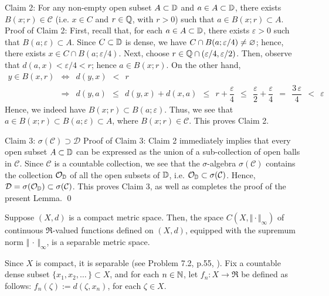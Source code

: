 \vskip 0.5cm
\noindent
Claim 2:\;\; For any non-empty open subset $A \subset \mathbb{D}$ and $a \in A \subset \mathbb{D}$,
there exists $B(x;r) \in \mathcal{C}$ (i.e. $x \in C$ and $r \in \mathbb{Q}$, with $r > 0$)
such that $a \in B(x;r) \subset A$.
\vskip 0.1cm
\noindent
Proof of Claim 2:\; First, recall that, for each $a \in A \subset \mathbb{D}$,
there exists $\varepsilon > 0$ such that $B(a;\varepsilon) \subset A$.
Since $C \subset \mathbb{D}$ is dense, we have $C \cap B(a;\varepsilon/4) \neq \varnothing$;
hence, there exists $x \in C \cap B(a;\varepsilon/4)$.
Next, choose $r \in \mathbb{Q} \cap (\varepsilon/4,\varepsilon/2)$.
Then, observe that $d(a,x) < \varepsilon/4 < r$; hence $a \in B(x;r)$.
On the other hand,
\begin{eqnarray*}
y \in B(x,r)
& \Longleftrightarrow &
	d(y,x) \;\, < \;\, r
\\
& \Longrightarrow &
	d(y,a)
	\,\;\leq\;\, d(y,x) + d(x,a)
	\,\;\leq\;\, r + \dfrac{\varepsilon}{4}
	\,\;\leq\;\, \dfrac{\varepsilon}{2} + \dfrac{\varepsilon}{4}
	\,\;=\;\, \dfrac{3\,\varepsilon}{4}
	\,\;<\;\, \varepsilon
\end{eqnarray*}
Hence, we indeed have $B(x;r) \subset B(a;\varepsilon)$.
Thus, we see that $a \in B(x;r) \subset B(a;\varepsilon) \subset A$,
where $B(x;r) \in \mathcal{C}$.
This proves Claim 2.

\vskip 0.5cm
\noindent
Claim 3:\;\; $\sigma(\mathcal{C}) \supset \mathcal{D}$
\vskip 0.1cm
\noindent
Proof of Claim 3:\; Claim 2 immediately implies that every open subset $A \subset \mathbb{D}$
can be expressed as the union of a sub-collection of open balls in $\mathcal{C}$.
Since $\mathcal{C}$ is a countable collection, we see that
the $\sigma$-algebra $\sigma(\mathcal{C})$ contains the collection $\mathcal{O}_{\mathbb{D}}$ 
of all the open subsets of $\mathbb{D}$, i.e. $\mathcal{O}_{\mathbb{D}} \subset \sigma(\mathcal{C})$.
Hence, $\mathcal{D} = \sigma(\mathcal{O}_{\mathbb{D}}) \subset \sigma(\mathcal{C})$.
This proves Claim 3, as well as completes the proof of the present Lemma.
\qed


\begin{proposition}
\label{XCompactImpliesCXSeparable}
\mbox{}\vskip 0.1cm
\noindent
Suppose $(X,d)$ is a compact metric space.
Then, the space $C(X,\Vert\cdot\Vert_{\infty})$ of continuous $\Re$-valued
functions defined on $(X,d)$, equipped with the supremum norm $\Vert\,\cdot\,\Vert_{\infty}$,
is a separable metric space.
\end{proposition}
\proof
Since $X$ is compact, it is separable (see Problem 7.2, p.55, \cite{Aliprantis1998}).
Fix a countable dense subset $\{x_{1},x_{2},\ldots\,\} \subset X$, and
for each $n \in \mathbb{N}$, let $f_{n} : X \longrightarrow \Re$ be defined as follows:
$f_{n}(\zeta) := d(\zeta,x_{n})$, for each $\zeta \in X$.

